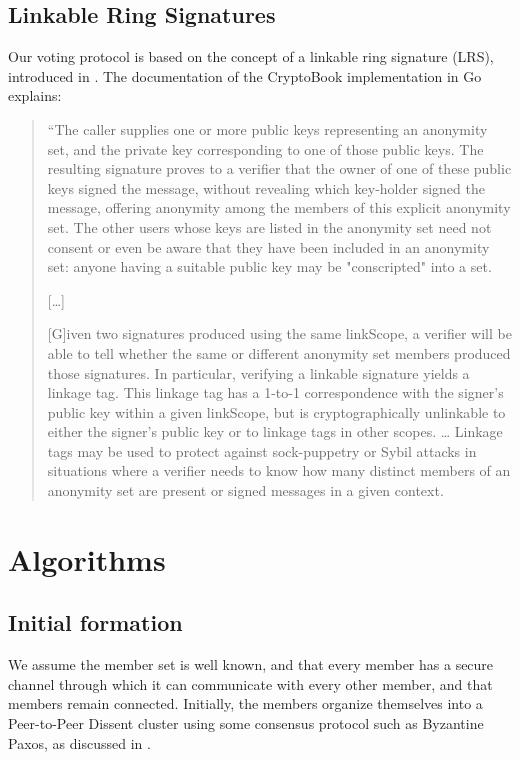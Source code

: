 \subsection{Linkable Ring Signatures}
Our voting protocol is based on the concept of a linkable ring signature (LRS),
introduced in \cite{lrs}. The documentation of the CryptoBook implementation in
Go explains:
\begin{quote}
 ``The caller supplies one or more public keys representing an anonymity set,
 and the private key corresponding to one of those public keys. The resulting
 signature proves to a verifier that the owner of one of these public keys
 signed the message, without revealing which key-holder signed the message,
 offering anonymity among the members of this explicit anonymity set. The other
 users whose keys are listed in the anonymity set need not consent or even be
 aware that they have been included in an anonymity set: anyone having a
 suitable public key may be "conscripted" into a set.

 [\ldots]

  [G]iven two signatures produced using the same linkScope, a verifier will be
  able to tell whether the same or different anonymity set members produced
  those signatures. In particular, verifying a linkable signature yields a
  linkage tag.  This linkage tag has a 1-to-1 correspondence with the signer's
  public key within a given linkScope, but is cryptographically unlinkable to
  either the signer's public key or to linkage tags in other scopes. \ldots
  Linkage tags may be used to protect against sock-puppetry or Sybil attacks in
  situations where a verifier needs to know how many distinct members of an
  anonymity set are present or signed messages in a given context.
\end{quote}
\cite{golrs}
\section{Algorithms}
\subsection{Initial formation}
We assume the member set is well known, and that every member has a secure
channel through which it can communicate with every other member, and that
members remain connected. Initially, the
members organize themselves into a Peer-to-Peer Dissent
cluster \cite{p2pd} using some consensus protocol such
as Byzantine Paxos, as discussed in \cite{sec}.

